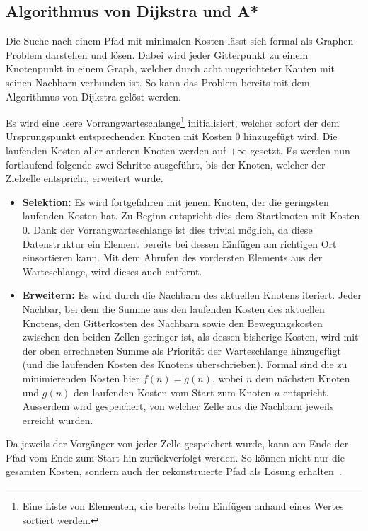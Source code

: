 \subsection{Algorithmus von Dijkstra und A*}

Die Suche nach einem Pfad mit minimalen Kosten lässt sich formal als Graphen-Problem darstellen und lösen. Dabei wird jeder Gitterpunkt zu einem Knotenpunkt in einem Graph, welcher durch acht ungerichteter Kanten mit seinen Nachbarn verbunden ist. So kann das Problem bereits mit dem Algorithmus von Dijkstra gelöst werden.~\cite{dijkstra1959note}

Es wird eine leere Vorrangwarteschlange\footnote{Eine Liste von Elementen, die bereits beim Einfügen anhand eines Wertes sortiert werden.} initialisiert, welcher sofort der dem Ursprungspunkt entsprechenden Knoten mit Kosten 0 hinzugefügt wird. Die laufenden Kosten aller anderen Knoten werden auf $+ \infty$ gesetzt. Es werden nun fortlaufend folgende zwei Schritte ausgeführt, bis der Knoten, welcher der Zielzelle entspricht, erweitert wurde.~\cite{dijkstra1959note}
\begin{itemize}
  \item \textbf{Selektion:} Es wird fortgefahren mit jenem Knoten, der die geringsten laufenden Kosten hat. Zu Beginn entspricht dies dem Startknoten mit Kosten 0. Dank der Vorrangwarteschlange ist dies trivial möglich, da diese Datenstruktur ein Element bereits bei dessen Einfügen am richtigen Ort einsortieren kann. Mit dem Abrufen des vordersten Elements aus der Warteschlange, wird dieses auch entfernt.~\cite{dijkstra1959note}
  \item \textbf{Erweitern:} Es wird durch die Nachbarn des aktuellen Knotens iteriert. Jeder Nachbar, bei dem die Summe aus den laufenden Kosten des aktuellen Knotens, den Gitterkosten des Nachbarn sowie den Bewegungskosten zwischen den beiden Zellen geringer ist, als dessen bisherige Kosten, wird mit der oben errechneten Summe als Priorität der Warteschlange hinzugefügt (und die laufenden Kosten des Knotens überschrieben). Formal sind die zu minimierenden Kosten hier $f(n)=g(n)$, wobei $n$ dem nächsten Knoten und $g(n)$ den laufenden Kosten vom Start zum Knoten $n$ entspricht. Ausserdem wird gespeichert, von welcher Zelle aus die Nachbarn jeweils erreicht wurden.~\cite{dijkstra1959note}
\end{itemize}

Da jeweils der Vorgänger von jeder Zelle gespeichert wurde, kann am Ende der Pfad vom Ende zum Start hin zurückverfolgt werden. So können nicht nur die gesamten Kosten, sondern auch der rekonstruierte Pfad als Lösung erhalten~\cite{dijkstra1959note}.

